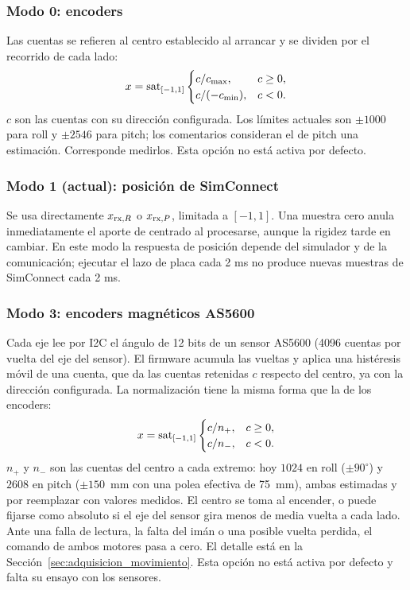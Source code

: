 \subsubsection{Modo 0: encoders}
Las cuentas se refieren al centro establecido al arrancar y se dividen por el recorrido de cada lado:
\begin{equation}
x=\operatorname{sat}_{[-1,1]}\begin{cases}
c/c_{\max},&c\ge0,\\
c/(-c_{\min}),&c<0.
\end{cases}
\end{equation}
$c$ son las cuentas con su dirección configurada. Los límites actuales son $\pm1000$ para roll y $\pm2546$ para pitch; los comentarios consideran el de pitch una estimación. Corresponde medirlos. Esta opción no está activa por defecto.

\subsubsection{Modo 1 (actual): posición de SimConnect}
Se usa directamente $x_{{\rm rx},R}$ o $x_{{\rm rx},P}$, limitada a $[-1,1]$. Una muestra cero anula inmediatamente el aporte de centrado al procesarse, aunque la rigidez tarde en cambiar. En este modo la respuesta de posición depende del simulador y de la comunicación; ejecutar el lazo de placa cada 2 ms no produce nuevas muestras de SimConnect cada 2 ms.

\subsubsection{Modo 3: encoders magnéticos AS5600}
Cada eje lee por I2C el ángulo de 12 bits de un sensor AS5600 (4096 cuentas por vuelta del eje del sensor). El firmware acumula las vueltas y aplica una histéresis móvil de una cuenta, que da las cuentas retenidas $c$ respecto del centro, ya con la dirección configurada. La normalización tiene la misma forma que la de los encoders:
\begin{equation}
x=\operatorname{sat}_{[-1,1]}\begin{cases}
c/n_{+},&c\ge0,\\
c/n_{-},&c<0.
\end{cases}
\end{equation}
$n_{+}$ y $n_{-}$ son las cuentas del centro a cada extremo: hoy $1024$ en roll ($\pm90^\circ$) y $2608$ en pitch ($\pm150$~mm con una polea efectiva de 75~mm), ambas estimadas y por reemplazar con valores medidos. El centro se toma al encender, o puede fijarse como absoluto si el eje del sensor gira menos de media vuelta a cada lado. Ante una falla de lectura, la falta del imán o una posible vuelta perdida, el comando de ambos motores pasa a cero. El detalle está en la Sección~\ref{sec:adquisicion_movimiento}. Esta opción no está activa por defecto y falta su ensayo con los sensores.

